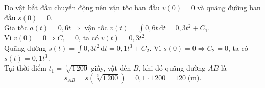 \begin{ex}
{\begin{center}
		\end{center}
		\begin{itemchoice}
			\itemch
			Do vật bắt đầu chuyển động nên vận tốc ban đầu $v(0)=0$ và quãng đường ban đầu $s(0)=0$.\\
			Gia tốc $a(t)=0{,}6t\Rightarrow$ vận tốc $v(t)=\displaystyle\int 0{,}6t\mathrm{\,d}t=0{,}3t^2+C_1$. \\
			Vì $v(0)=0\Rightarrow C_1=0$, ta có $v(t)=0{,}3t^2$.\\
			Quãng đường $s(t)=\displaystyle\int 0{,}3t^2\mathrm{\,d}t=0{,}1t^3+C_2$. Vì $s(0)=0\Rightarrow C_2=0$, ta có $s(t)=0{,}1t^3$.\\
			Tại thời điểm $t_1=\sqrt[3]{1\,200}$ giây, vật đến $B$, khi đó quãng đường $AB$ là \[s_{AB}=s\left(\sqrt[3]{1\,200}\right)=0{,}1\cdot 1\,200=120\;\text{(m).}\]
			

\end{itemchoice}}
\end{ex}
